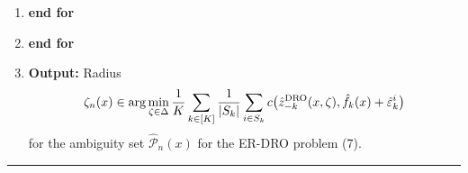 \documentclass[10pt,a4paper]{article}
\begin{document}
\begin{mdframed}[linewidth=0.6pt]
\begin{enumerate}[label=\arabic*:,leftmargin=19pt,itemsep=2pt,parsep=0pt]
\item \hspace{6pt}\textbf{end for}
\item \textbf{end for}
\item \textbf{Output:} Radius
\[
\zeta_n(x)\in\arg\min_{\zeta\in\Delta}\frac1K\sum_{k\in[K]}\frac1{|S_k|}\sum_{i\in S_k}c\bigl(\hat z_{-k}^{\rm DRO}(x,\zeta),\hat f_k(x)+\hat\varepsilon_k^i\bigr)
\]
for the ambiguity set $\hat{\mathcal P}_n(x)$ for the ER-DRO problem (7).
\end{enumerate}
\hrule
\end{mdframed}
\end{document}
